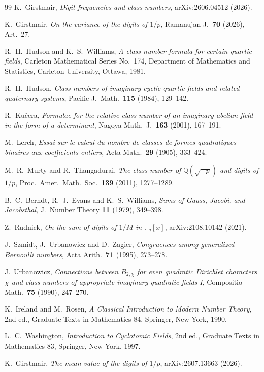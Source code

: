 \documentclass[11pt,reqno]{amsart}
\theoremstyle{plain}
\theoremstyle{definition}
\newcommand{\Q}{\mathbb{Q}}
\newcommand{\F}{\mathbb{F}}
\begin{document}
\begin{thebibliography}{99}
 K.~Girstmair, \emph{Digit frequencies and class numbers}, arXiv:2606.04512 (2026).

 K.~Girstmair, \emph{On the variance of the digits of $1/p$}, Ramanujan J.\ \textbf{70} (2026), Art.~27.

 R.~H.~Hudson and K.~S.~Williams, \emph{A class number formula for certain quartic fields}, Carleton
Mathematical Series No.~174, Department of Mathematics and Statistics, Carleton University, Ottawa, 1981.

 R.~H.~Hudson, \emph{Class numbers of imaginary cyclic quartic fields and related quaternary systems},
Pacific J.\ Math.\ \textbf{115} (1984), 129--142.

 R.~Ku\v{c}era, \emph{Formulae for the relative class number of an imaginary abelian field in the form of a
determinant}, Nagoya Math.\ J.\ \textbf{163} (2001), 167--191.

 M.~Lerch, \emph{Essai sur le calcul du nombre de classes de formes quadratiques binaires aux coefficients
entiers}, Acta Math.\ \textbf{29} (1905), 333--424.

 M.~R.~Murty and R.~Thangadurai, \emph{The class number of $\Q(\sqrt{-p})$ and digits of $1/p$}, Proc.\ Amer.\
Math.\ Soc.\ \textbf{139} (2011), 1277--1289.

 B.~C.~Berndt, R.~J.~Evans and K.~S.~Williams, \emph{Sums of Gauss, Jacobi, and Jacobsthal}, J.\ Number
Theory \textbf{11} (1979), 349--398.

 Z.~Rudnick, \emph{On the sum of digits of $1/M$ in $\F_q[x]$}, arXiv:2108.10142 (2021).

 J.~Szmidt, J.~Urbanowicz and D.~Zagier, \emph{Congruences among generalized Bernoulli numbers}, Acta Arith.\
\textbf{71} (1995), 273--278.

 J.~Urbanowicz, \emph{Connections between $B_{2,\chi}$ for even quadratic Dirichlet characters $\chi$ and class
numbers of appropriate imaginary quadratic fields I}, Compositio Math.\ \textbf{75} (1990), 247--270.

\bibitem{IR} K.~Ireland and M.~Rosen, \emph{A Classical Introduction to Modern Number Theory}, 2nd ed., Graduate Texts in
Mathematics 84, Springer, New York, 1990.

 L.~C.~Washington, \emph{Introduction to Cyclotomic Fields}, 2nd ed., Graduate Texts in Mathematics 83,
Springer, New York, 1997.

 K.~Girstmair, \emph{The mean value of the digits of $1/p$}, arXiv:2607.13663 (2026).

\end{thebibliography}
\end{document}
